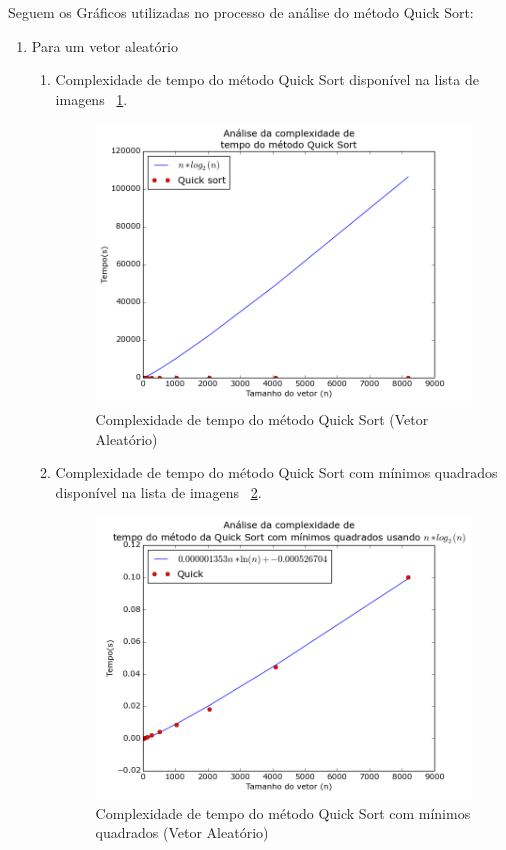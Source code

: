 \documentclass[12pt,a4paper,twoside]{report}
\begin{document}
Seguem os Gráficos utilizadas no processo de análise do método Quick Sort:
\begin{enumerate}

	\item Para um vetor aleatório
	\begin{enumerate}
	

		\item Complexidade de tempo do método Quick Sort disponível na lista de imagens ~\ref{fig:QuickPlot2A}.
		\begin{figure}[!h]
			\centering
			\includegraphics[scale=0.6]{../imagens/Quick/Quick_plot_2_aleatorio.png}
			\caption{Complexidade de tempo do método Quick Sort (Vetor Aleatório)\label{fig:QuickPlot2A}}
		\end{figure}


		\item Complexidade de tempo do método Quick Sort com mínimos quadrados disponível na lista de imagens ~\ref{fig:QuickPlot3A}.
		\begin{figure}[!h]
			\centering
			\includegraphics[scale=0.6]{../imagens/Quick/Quick_plot_3_aleatorio.png}
			\caption{Complexidade de tempo do método Quick Sort com mínimos quadrados (Vetor Aleatório) \label{fig:QuickPlot3A}}
		\end{figure}


\end{enumerate}
\end{enumerate}
\end{document}
